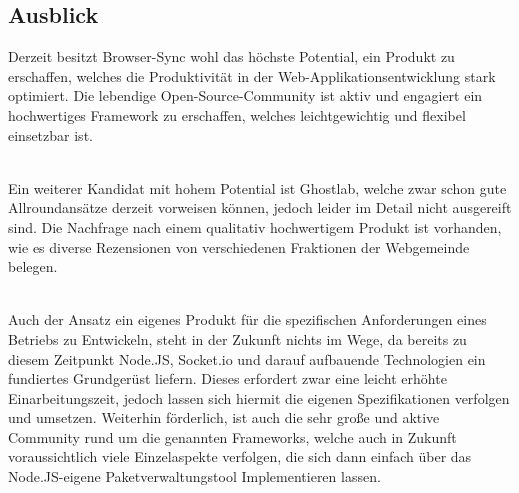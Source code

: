 \subsection{Ausblick}

Derzeit besitzt Browser-Sync wohl das höchste Potential, ein Produkt zu erschaffen, welches die Produktivität in der Web-Applikationsentwicklung stark optimiert. Die lebendige Open-Source-Community ist aktiv und engagiert ein hochwertiges Framework zu erschaffen, welches leichtgewichtig und flexibel einsetzbar ist. 

\\ Ein weiterer Kandidat mit hohem Potential ist Ghostlab, welche zwar schon gute Allroundansätze derzeit vorweisen können, jedoch leider im Detail nicht ausgereift sind. Die Nachfrage nach einem qualitativ hochwertigem Produkt ist vorhanden, wie es diverse Rezensionen von verschiedenen Fraktionen der Webgemeinde belegen.

\\ Auch der Ansatz ein eigenes Produkt für die spezifischen Anforderungen eines Betriebs zu Entwickeln, steht in der Zukunft nichts im Wege, da bereits zu diesem Zeitpunkt Node.JS, Socket.io und darauf aufbauende Technologien ein fundiertes Grundgerüst liefern. 
Dieses erfordert zwar eine leicht erhöhte Einarbeitungszeit, jedoch lassen sich hiermit die eigenen Spezifikationen verfolgen und umsetzen. Weiterhin förderlich, ist auch die sehr große und aktive Community rund um die genannten Frameworks, welche auch in Zukunft voraussichtlich viele Einzelaspekte verfolgen, die sich dann einfach über das Node.JS-eigene Paketverwaltungstool Implementieren lassen.